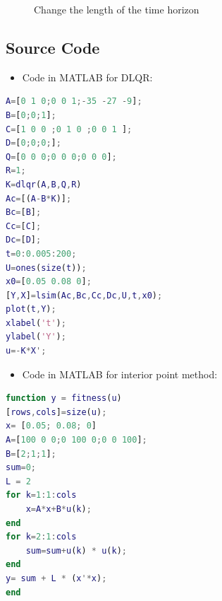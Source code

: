 \documentclass{mcmthesis}
\begin{document}
\begin{figure}[H]
%
%
\centering
\caption{Change the length of the time horizon}
\end{figure}





\begin{appendices}

\section{ Source Code}
\begin{itemize}
\item Code in MATLAB for DLQR:
\end{itemize}
\begin{lstlisting}[language=MATLAB, caption=LQR in MATLAB]
A=[0 1 0;0 0 1;-35 -27 -9];
B=[0;0;1];
C=[1 0 0 ;0 1 0 ;0 0 1 ];
D=[0;0;0;];
Q=[0 0 0;0 0 0;0 0 0];
R=1;
K=dlqr(A,B,Q,R)
Ac=[(A-B*K)];
Bc=[B];
Cc=[C];
Dc=[D];
t=0:0.005:200;
U=ones(size(t));
x0=[0.05 0.08 0];
[Y,X]=lsim(Ac,Bc,Cc,Dc,U,t,x0);
plot(t,Y);
xlabel('t');
ylabel('Y');
u=-K*X';
\end{lstlisting}
\begin{itemize}
\item Code in MATLAB for interior point method:
\end{itemize}

\begin{lstlisting}[language=MATLAB, caption=Function for interior point method]
function y = fitness(u)
[rows,cols]=size(u);
x= [0.05; 0.08; 0]
A=[100 0 0;0 100 0;0 0 100];
B=[2;1;1];
sum=0;
L = 2
for k=1:1:cols
    x=A*x+B*u(k);
end
for k=2:1:cols
    sum=sum+u(k) * u(k);
end
y= sum + L * (x'*x);
end
\end{lstlisting}


\end{appendices}
\end{document}
